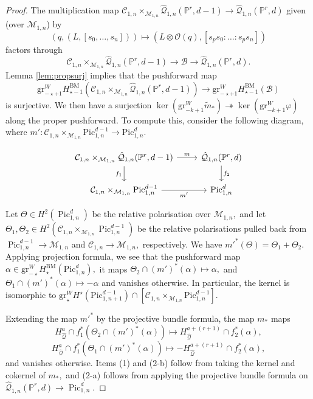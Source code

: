 \documentclass[12pt,reqno]{amsart}
\theoremstyle{definition}
\theoremstyle{definition}
\theoremstyle{definition}
\theoremstyle{definition}
\DeclareMathOperator{\Pic}{Pic}
\newcommand{\PP}{\mathbb{P}}
\newcommand{\gr}{\mathrm{gr}}
\begin{document}
\begin{proof}
The multiplication map $\mathcal{C}_{1,n}\times_{\mathcal{M}_{1,n}} \hat{\mathcal{Q}}_{1,n}(\PP^r,d-1)\to \hat{\mathcal{Q}}_{1,n}(\PP^r,d)$ given (over $\mathcal{M}_{1,n}$) by $$(q, (L, [s_0,\dots,s_n]))\mapsto (L\otimes \mathcal{O}(q), [s_p s_0:\dots:s_p s_n])$$ factors through $$\mathcal{C}_{1,n}\times_{\mathcal{M}_{1,n}} \hat{\mathcal{Q}}_{1,n}(\PP^r,d-1)\to \mathcal{B}\to \hat{\mathcal{Q}}_{1,n}(\PP^r,d).$$ Lemma \ref{lem:propsurj} implies that the pushforward map $$\gr^W_{-\star+1} H_{{\star-1}}^{\mathrm{BM}}(\mathcal{C}_{1,n}\times_{\mathcal{M}_{1,n}}\hat{\mathcal{Q}}_{1,n}(\PP^r,d-1))\to \gr^W_{-\star+1} H_{{\star-1}}^{\mathrm{BM}}(\mathcal{B})$$ is surjective. We then have a surjection $\ker(\gr^W_{-k+1}\tilde m_*)\twoheadrightarrow\ker(\gr^W_{-k+1}\varphi)$ along the proper pushforward. To compute this, consider the following diagram, where $m': \mathcal{C}_{1,n}\times_{\mathcal{M}_{1,n}}\mathrm{Pic}^{d-1}_{1,n}\to \mathrm{Pic}^{d}_{1,n}.$

\[\begin{tikzcd}
	{\mathcal{C}_{1,n}\times_{\mathcal{M}_{1,n}} \hat{\mathcal{Q}}_{1,n}(\PP^r,d-1)} & {\hat{\mathcal{Q}}_{1,n}(\PP^r,d)} \\
	{\mathcal{C}_{1,n}\times_{\mathcal{M}_{1,n}}\mathrm{Pic}^{d-1}_{1,n}} & {\mathrm{Pic}^{d}_{1,n}}
	\arrow["m", from=1-1, to=1-2]
	\arrow["{f_1}"', from=1-1, to=2-1]
	\arrow["{f_2}", from=1-2, to=2-2]
	\arrow["{m'}"', from=2-1, to=2-2]
\end{tikzcd}\]

Let $\Theta\in H^2(\Pic^d_{1,n})$ be the relative polarisation over $\mathcal{M}_{1,n},$ and let $\Theta_1,\Theta_2\in H^2(\mathcal{C}_{1,n}\times_{\mathcal{M}_{1,n}}\Pic^{d-1}_{1,n})$ be the relative polarisations pulled back from $\Pic^{d-1}_{1,n}\to \mathcal{M}_{1,n}$ and $\mathcal{C}_{1,n}\to \mathcal{M}_{1,n},$ respectively. We have ${m'}^*(\Theta) = \Theta_1 + \Theta_2.$ Applying projection formula, we see that the pushforward map $\alpha\in \mathrm{gr}^W_{-\star} H_{\star}^{\mathrm{BM}}(\mathrm{Pic}^{d}_{1,n}),$ it maps $\Theta_2\cap (m')^*(\alpha)\mapsto \alpha,$ and $\Theta_1\cap (m')^*(\alpha)\mapsto -\alpha$ and vanishes otherwise. In particular, the kernel is isomorphic to $\mathrm{gr}^W_{\star} H^\star(\mathrm{Pic}^{d-1}_{1,n+1})\cap [\mathcal{C}_{1,n}\times_{\mathcal{M}_{1,n}}\mathrm{Pic}_{1,n}^{d-1}].$

Extending the map ${m'}^*$ by the projective bundle formula, the map $m_*$ maps $$H_{\hat{\mathcal{Q}}}^a\cap f_1^*(\Theta_2\cap (m')^*(\alpha))\mapsto H_{\hat{\mathcal{Q}}}^{a+(r+1)}\cap f_2^*(\alpha),$$ $$H_{\hat{\mathcal{Q}}}^a\cap f_1^*(\Theta_1\cap (m')^*(\alpha))\mapsto -H_{\hat{\mathcal{Q}}}^{a+(r+1)}\cap f_2^*(\alpha),$$
and vanishes otherwise. Items (1) and (2-b) follow from taking the kernel and cokernel of $m_*,$ and (2-a) follows from applying the projective bundle formula on $\hat{\mathcal{Q}}_{1,n}(\PP^r,d)\to \Pic^d_{1,n}.$
\end{proof}
\end{document}
